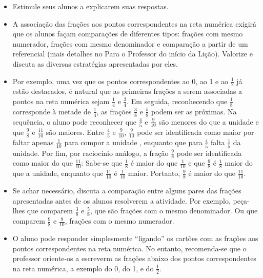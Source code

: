 \documentclass[10 pt,usenames,dvipsnames, oneside]{article}
\begin{document}
\begin{goals}
\begin{itemize}
\item Estimule seus alunos a explicarem suas respostas.
\item A associação das frações aos pontos correspondentes na reta numérica exigirá que os alunos façam comparações de diferentes tipos: frações com mesmo numerador, frações com mesmo denominador e comparação a partir de um referencial (mais detalhes no Para o Professor do início da Lição). Valorize e discuta as diversas estratégias apresentadas por eles.
\item       Por exemplo, uma vez que os pontos correspondentes ao 0, ao 1 e ao $\frac{1}{2}$ já estão destacados, é natural que as primeiras frações a serem associadas a pontos na reta numérica sejam       $\frac{1}{4}$       e       $\frac{3}{4}$. Em seguida, reconhecendo que       $\frac{1}{8}$       corresponde à metade de       $\frac{1}{4}$,  as frações       $\frac{3}{8}$       e       $\frac{5}{8}$       podem ser as próximas.  Na sequência, o aluno pode reconhecer que       $\frac{4}{5}$       e       $\frac{9}{10}$       são menores do que a unidade e que       $\frac{9}{8}$       e       $\frac{11}{10}$       são maiores.  Entre       $\frac{4}{5}$       e       $\frac{9}{10}$,       $\frac{9}{10}$       pode ser identificada como maior por faltar  apenas       $\frac{1}{10}$       para compor a unidade , enquanto que para       $\frac{4}{5}$       falta       $\frac{1}{5}$       da unidade. Por fim, por raciocínio análogo, a fração       $\frac{9}{8}$       pode ser identificada como maior do que       $\frac{11}{10}$: Sabe-se que $\frac{1}{8}$ é maior do que $\frac{1}{10}$ e que $\frac{9}{8}$  é  $\frac{1}{8}$       maior do que a unidade, enquanto que       $\frac{11}{10}$       é        $\frac{1}{10}$       maior. Portanto, $\frac{9}{8}$    é maior do que       $\frac{11}{10}$.
\item       Se achar necessário, discuta a comparação entre alguns pares das frações apresentadas antes de os alunos resolverem a atividade. Por exemplo, peça-lhes que comparem       $\frac{3}{8}$        e       $\frac{5}{8}$, que são frações com o mesmo denominador. Ou que comparem       $\frac{9}{8}$       e       $\frac{9}{10}$, frações com o mesmo numerador.
\item       O aluno pode responder simplesmente       ``ligando''       os cartões com as frações aos pontos correspondentes na reta numérica. No entanto, recomenda-se que o professor oriente-os a escreverm as frações abaixo dos pontos correspondentes na reta numérica, a exemplo do 0, do 1, e do       $\frac{1}{2}$.
\end{itemize}
\end{goals}
\end{document}
